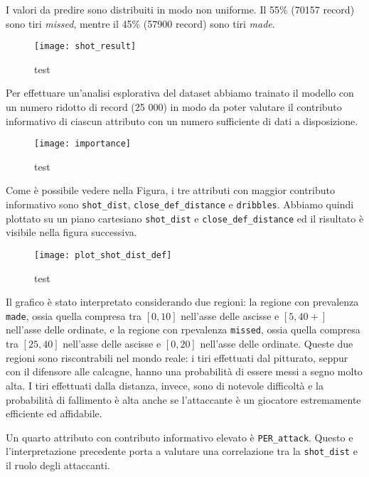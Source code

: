 \par
I valori da predire sono distribuiti in modo non uniforme. Il 55\% (70157 record) sono tiri \textit{missed}, mentre il 45\% (57900 record) sono tiri \textit{made}.

\begin{figure}
\caption{test}
\fontsize{9pt}{1em}
	\texttt{[image: shot\_result]}
\end{figure}

\par
Per effettuare un'analisi esplorativa del dataset abbiamo trainato il modello con un numero ridotto di record (25 000) in modo da poter valutare il contributo informativo di ciascun attributo con un numero sufficiente di dati a disposizione.

\begin{figure}
\caption{test}
\fontsize{9pt}{1em}
	\texttt{[image: importance]}
\end{figure}

\par
Come è possibile vedere nella Figura, i tre attributi con maggior contributo informativo sono \texttt{shot_dist}, \texttt{close_def_distance} e \texttt{dribbles}. Abbiamo quindi plottato su un piano cartesiano \texttt{shot_dist} e \texttt{close_def_distance} ed il risultato è visibile nella figura successiva.

\begin{figure}
\caption{test}
\fontsize{9pt}{1em}
	\texttt{[image: plot\_shot\_dist\_def]}
\end{figure}

Il grafico è stato interpretato considerando due regioni: la regione con prevalenza \texttt{made}, ossia quella compresa tra $[0, 10]$ nell'asse delle ascisse e $[5, 40+] $ nell'asse delle ordinate, e la regione con rpevalenza \texttt{missed}, ossia quella compresa tra $[25, 40]$ nell'asse delle ascisse e $[0, 20] $ nell'asse delle ordinate.
Queste due regioni sono riscontrabili nel mondo reale: i tiri effettuati dal pitturato, seppur con il difensore alle calcagne, hanno una probabilità di essere messi a segno molto alta. I tiri effettuati dalla distanza, invece, sono di notevole difficoltà e la probabilità di fallimento è alta anche se l'attaccante è un giocatore estremamente efficiente ed affidabile.

\par
Un quarto attributo con contributo informativo elevato è \texttt{PER_attack}. Questo e l'interpretazione precedente porta a valutare una correlazione tra la \texttt{shot_dist} e il ruolo degli attaccanti.

